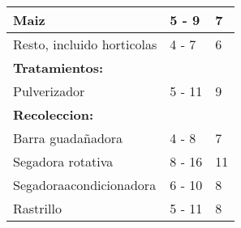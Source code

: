 \documentclass{article}
\begin{document}
\begin{table}[]
\begin{tabular}{lll}
			\multicolumn{1}{|l|}{Maiz}                            & \multicolumn{1}{l|}{5 - 9}                                                            & \multicolumn{1}{l|}{7}                                                                      \\ \hline
			\multicolumn{1}{|l|}{Resto,   incluido horticolas}    & \multicolumn{1}{l|}{4 - 7}                                                            & \multicolumn{1}{l|}{6}                                                                      \\ \hline
			\multicolumn{1}{|l|}{\textbf{Tratamientos:}}          & \multicolumn{1}{l|}{}                                                                 & \multicolumn{1}{l|}{}                                                                       \\ \hline
			\multicolumn{1}{|l|}{Pulverizador}                    & \multicolumn{1}{l|}{5 - 11}                                                           & \multicolumn{1}{l|}{9}                                                                      \\ \hline
			\multicolumn{1}{|l|}{\textbf{Recoleccion:}}           & \multicolumn{1}{l|}{}                                                                 & \multicolumn{1}{l|}{}                                                                       \\ \hline
			\multicolumn{1}{|l|}{Barra   guadañadora}             & \multicolumn{1}{l|}{4 - 8}                                                            & \multicolumn{1}{l|}{7}                                                                      \\ \hline
			\multicolumn{1}{|l|}{Segadora   rotativa}             & \multicolumn{1}{l|}{8 - 16}                                                           & \multicolumn{1}{l|}{11}                                                                     \\ \hline
			\multicolumn{1}{|l|}{Segadoraacondicionadora}         & \multicolumn{1}{l|}{6 - 10}                                                           & \multicolumn{1}{l|}{8}                                                                      \\ \hline
			\multicolumn{1}{|l|}{Rastrillo}                       & \multicolumn{1}{l|}{5 - 11}                                                           & \multicolumn{1}{l|}{8}                                                                      \\ \hline

\end{tabular}
\end{table}
\end{document}
